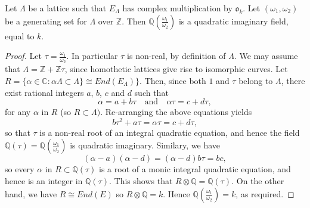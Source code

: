 \begin{lem}
  \label{lem:Q-adjoin-w1-over-w2-is-quadratic-imaginary}
  Let $\Lambda$ be a lattice such that $E_{\Lambda}$ has complex multiplication by
  $\mathfrak{o}_{k}$.  Let $(\omega_{1},\omega_{2})$ be a generating set for
  $\Lambda$ over $\mathbb{Z}$.  Then $\mathbb{Q}(\frac{\omega_{1}}{\omega_{2}})$ is a
  quadratic imaginary field, equal to $k$.
\end{lem}
\begin{proof}
  Let $\tau = \frac{\omega_{1}}{\omega_{2}}$.  In particular $\tau$ is non-real, by
  definition of $\Lambda$.  We may assume that $\Lambda = \mathbb{Z} +
  \mathbb{Z}\tau$, since homothetic lattices give rise to isomorphic curves.  Let $R
  = \{\alpha \in \mathbb{C} : \alpha \Lambda \subset \Lambda \} \cong
  End(E_{\Lambda}) \}$.  Then, since both $1$ and $\tau$ belong to $\Lambda$, there
  exist rational integers $a$, $b$, $c$ and $d$ such that
  \begin{equation*}
    \alpha = a + b\tau \quad \text{and} \quad \alpha \tau = c + d \tau,
  \end{equation*}
  for any $\alpha$ in $R$ (so $R \subset \Lambda)$.  Re-arranging the above equations
  yields
  \begin{equation*}
    b\tau^{2} + a\tau = \alpha\tau = c + d\tau,
  \end{equation*}
  so that $\tau$ is a non-real root of an integral quadratic equation, and hence the
  field $\mathbb{Q}(\tau) = \mathbb{Q}(\frac{\omega_{1}}{\omega_{2}})$ is quadratic
  imaginary.  Similary, we have
  \begin{equation*}
    (\alpha - a)(\alpha - d) = (\alpha - d)b\tau = bc,
  \end{equation*}
  so every $\alpha$ in $R \subset \mathbb{Q}(\tau)$ is a root of a monic integral
  quadratic equation, and hence is an integer in $\mathbb{Q}(\tau)$.  This shows that
  $R \otimes \mathbb{Q} = \mathbb{Q}(\tau)$.  On the other hand, we have $R \cong
  End(E)$ so $R \otimes \mathbb{Q} = k$.  Hence
  $\mathbb{Q}(\frac{\omega_{1}}{\omega_{2}}) = k$, as required.
\end{proof}


